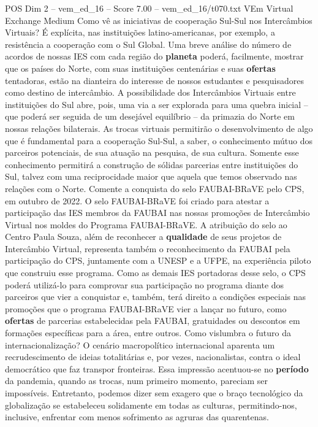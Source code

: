 \begin{textsample}{POS Dim 2 – vem\_ed\_16 – Score 7.00 – vem\_ed\_16/t070.txt}  \label{ex:f2_pos_085}
VEm Virtual Exchange Medium Como vê as iniciativas de cooperação Sul-Sul nos Intercâmbios Virtuais?
É explícita, nas instituições latino-americanas, por exemplo, a resistência a cooperação com o Sul Global.
Uma breve análise do número de acordos de nossas IES com cada região do \textbf{planeta} poderá, facilmente, mostrar que os países do Norte, com suas instituições centenárias e suas \textbf{ofertas} tentadoras, estão na dianteira do interesse de nossos estudantes e pesquisadores como destino de intercâmbio.
A possibilidade dos Intercâmbios Virtuais entre instituições do Sul abre, pois, uma via a ser explorada para uma quebra inicial – que poderá ser seguida de um desejável equilíbrio – da primazia do Norte em nossas relações bilaterais.
As trocas virtuais permitirão o desenvolvimento de algo que é fundamental para a cooperação Sul-Sul, a saber, o conhecimento mútuo dos parceiros potenciais, de sua atuação na pesquisa, de sua cultura.
Somente esse conhecimento permitirá a construção de sólidas parcerias entre instituições do Sul, talvez com uma reciprocidade maior que aquela que temos observado nas relações com o Norte.
Comente a conquista do selo FAUBAI-BRaVE pelo CPS, em outubro de 2022.
O selo FAUBAI-BRaVE foi criado para atestar a participação das IES membros da FAUBAI nas nossas promoções de Intercâmbio Virtual nos moldes do Programa FAUBAI-BRaVE.
A atribuição do selo ao Centro Paula Souza, além de reconhecer a \textbf{qualidade} de seus projetos de Intercâmbio Virtual, representa também o reconhecimento da FAUBAI pela participação do CPS, juntamente com a UNESP e a UFPE, na experiência piloto que construiu esse programa.
Como as demais IES portadoras desse selo, o CPS poderá utilizá-lo para comprovar sua participação no programa diante dos parceiros que vier a conquistar e, também, terá direito a condições especiais nas promoções que o programa FAUBAI-BRaVE vier a lançar no futuro, como \textbf{ofertas} de parcerias estabelecidas pela FAUBAI, gratuidades ou descontos em formações específicas para a área, entre outros.
Como vislumbra o futuro da internacionalização?
O cenário macropolítico internacional aparenta um recrudescimento de ideias totalitárias e, por vezes, nacionalistas, contra o ideal democrático que faz transpor fronteiras.
Essa impressão acentuou-se no \textbf{período} da pandemia, quando as trocas, num primeiro momento, pareciam ser impossíveis.
Entretanto, podemos dizer sem exagero que o braço tecnológico da globalização se estabeleceu solidamente em todas as culturas, permitindo-nos, inclusive, enfrentar com menos sofrimento as agruras das quarentenas.

\end{textsample}
